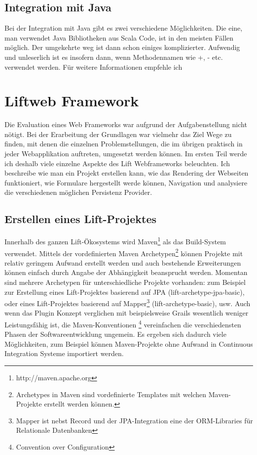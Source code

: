 \subsection{Integration mit Java}\label{grundlagen:integration:java}
Bei der Integration mit Java gibt es zwei verschiedene M\"oglichkeiten. Die eine, man verwendet Java Bibliotheken aus Scala Code, ist in den meisten F\"allen m\"oglich. Der umgekehrte weg ist dann schon einiges komplizierter. Aufwendig und unleserlich ist es insofern dann, wenn Methodennamen wie +, - etc. verwendet werden. F\"ur weitere Informationen empfehle ich \cite[p. 569 - 581]{odersky2008programming}

\section{Liftweb Framework}\label{einarbeitung:lift}
Die Evaluation eines Web Frameworks war aufgrund der Aufgabenstellung nicht n\"otigt. Bei der Erarbeitung der Grundlagen war vielmehr das Ziel Wege zu finden, mit denen die einzelnen Problemstellungen, die im \"ubrigen praktisch in jeder Webapplikation auftreten, umgesetzt werden k\"onnen. Im ersten Teil werde ich deshalb viele einzelne Aspekte des Lift Webframeworks beleuchten. Ich beschreibe wie man ein Projekt erstellen kann, wie das Rendering der Webseiten funktioniert, wie Formulare hergestellt werde k\"onnen, Navigation und analysiere die verschiedenen m\"oglichen Persistenz Provider.

\subsection{Erstellen eines Lift-Projektes}\label{lift:create}
Innerhalb des ganzen Lift-\"Okosystems wird Maven\footnote{http://maven.apache.org} als das Build-System verwendet. Mittels der vordefinierten Maven Archetypen\footnote{Archetypes in Maven sind vordefinierte Templates mit welchen Maven-Projekte erstellt werden k\"onnen.} k\"onnen Projekte mit relativ geringem Aufwand erstellt werden und auch bestehende Erweiterungen k\"onnen einfach durch Angabe der Abh\"angigkeit beansprucht werden. Momentan sind mehrere Archetypen f\"ur unterschiedliche Projekte vorhanden: zum Beispiel zur Erstellung eines Lift-Projektes basierend auf JPA (lift-archetype-jpa-basic), oder eines Lift-Projektes basierend auf Mapper\footnote{Mapper ist nebst Record und der JPA-Integration eine der ORM-Libraries f\"ur Relationale Datenbanken} (lift-archetype-basic), usw. Auch wenn das Plugin Konzept verglichen mit beispielsweise Grails wesentlich weniger Leistungsf\"ahig ist, die Maven-Konventionen \footnote{Convention over Configuration} vereinfachen die verschiedensten Phasen der Softwareentwicklung ungemein. Es ergeben sich dadurch viele M\"oglichkeiten, zum Beispiel k\"onnen Maven-Projekte ohne Aufwand in Continuous Integration Systeme importiert werden. 


